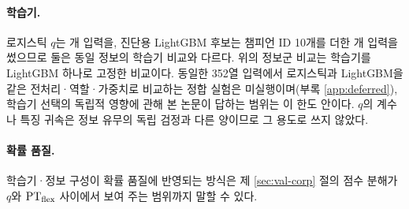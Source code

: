 

\paragraph{학습기.} 로지스틱 $q$는 \dimInputQ{}개 입력을, 진단용 LightGBM 후보는 챔피언 ID 10개를 더한 \dimInputLgbm{}개 입력을 썼으므로 둘은 동일 정보의 학습기 비교와 다르다. 위의 정보군 비교는 학습기를 LightGBM 하나로 고정한 비교이다. 동일한 352열 입력에서 로지스틱과 LightGBM을 같은 전처리·역할·가중치로 비교하는 정합 실험은 미실행이며(부록 \ref{app:deferred}), 학습기 선택의 독립적 영향에 관해 본 논문이 답하는 범위는 이 한도 안이다. $q$의 계수나 특징 귀속은 정보 유무의 독립 검정과 다른 양이므로 그 용도로 쓰지 않았다.

\paragraph{확률 품질.} 학습기·정보 구성이 확률 품질에 반영되는 방식은 제 \ref{sec:val-corp} 절의 점수 분해가 $q$와 $\mathrm{PT}_{\mathrm{flex}}$ 사이에서 보여 주는 범위까지 말할 수 있다.
